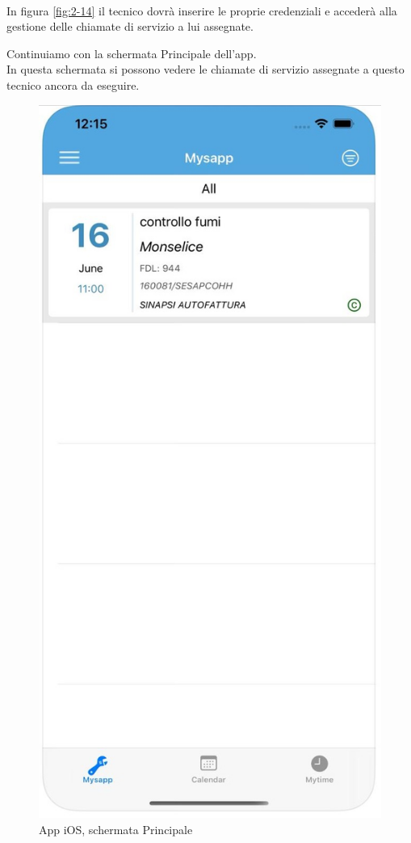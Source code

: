 \\In figura \ref{fig:2-14} il tecnico dovrà inserire le proprie credenziali e accederà alla gestione delle chiamate di servizio a lui assegnate.
\newpage
\begin{flushleft}
	Continuiamo con la schermata Principale dell'app.
	\\In questa schermata si possono vedere le chiamate di servizio assegnate a questo tecnico ancora da eseguire.
\end{flushleft}
\begin{figure}[!h] 
	\centering 
	\includegraphics[scale = 0.13]{immagini/app iOS/elenco-interventi-iOS.jpeg} 
	\caption {App iOS, schermata Principale}
	\label{fig:2-15}
\end{figure}

